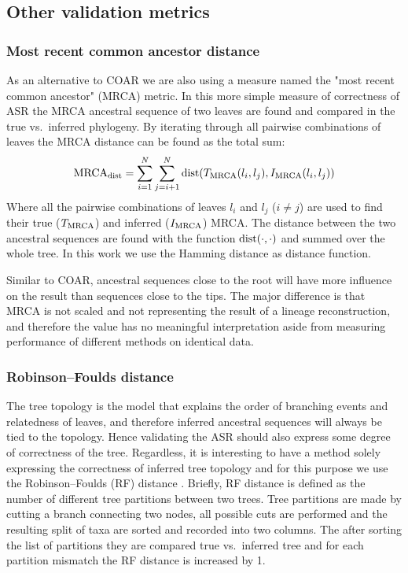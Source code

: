\subsection{Other validation metrics}

\subsubsection{Most recent common ancestor distance}
As an alternative to COAR we are also using a measure named the "most recent common ancestor" (MRCA) metric.
In this more simple measure of correctness of ASR the MRCA ancestral sequence of two leaves are found and compared in the true vs.\ inferred phylogeny.
By iterating through all pairwise combinations of leaves the MRCA distance can be found as the total sum:
$$
\text{\text{MRCA}}_{\text{dist}} = \sum_{i=1}^{N} \sum_{j=i+1}^{N} \text{dist}(T_{\text{\text{MRCA}}}(l_i, l_j), I_{\text{\text{MRCA}}}(l_i, l_j))
$$
Where all the pairwise combinations of leaves $l_i$ and $l_j$ ($i \neq j$) are used to find their true ($T_{\text{\text{MRCA}}}$) and inferred ($I_{\text{\text{MRCA}}}$) MRCA.
The distance between the two ancestral sequences are found with the function $\text{dist}(\cdot, \cdot)$ and summed over the whole tree.
In this work we use the Hamming distance as distance function.

Similar to COAR, ancestral sequences close to the root will have more influence on the result than sequences close to the tips.
The major difference is that MRCA is not scaled and not representing the result of a lineage reconstruction, and therefore the value has no meaningful interpretation aside from measuring performance of different methods on identical data.


\subsubsection{Robinson–Foulds distance}
The tree topology is the model that explains the order of branching events and relatedness of leaves, and therefore inferred ancestral sequences will always be tied to the topology.
Hence validating the ASR should also express some degree of correctness of the tree.
Regardless, it is interesting to have a method solely expressing the correctness of inferred tree topology and for this purpose we use the Robinson–Foulds (RF) distance \cite{robinson1981comparison}.
Briefly, RF distance is defined as the number of different tree partitions between two trees.
Tree partitions are made by cutting a branch connecting two nodes, all possible cuts are performed and the resulting split of taxa are sorted and recorded into two columns.
The after sorting the list of partitions they are compared true vs.\ inferred tree and for each partition mismatch the RF distance is increased by 1.



